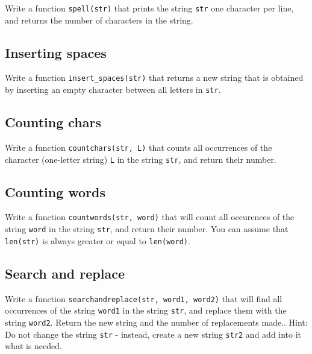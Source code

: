 Write a function {\tt spell(str)} that prints the string {\tt str} one character 
per line, and returns the number of characters in the string.


\subsection{Inserting spaces}

Write a function {\tt insert\_spaces(str)} that returns a new string that is obtained 
by inserting an empty character between all letters in {\tt str}. 


\subsection{Counting chars}

Write a function {\tt countchars(str, L)} that counts 
all occurrences of the character (one-letter string) {\tt L} in the string {\tt str}, 
and return their number. 


\subsection{Counting words}

Write a function {\tt countwords(str, word)} that will count 
all occurences of the string {\tt word} in the string {\tt str}, and 
return their number. You can assume that {\tt len(str)} is always greater 
or equal to {\tt len(word)}.


\subsection{Search and replace}

Write a function {\tt searchandreplace(str, word1, word2)} that will 
find all occurrences of the string {\tt word1} in the string {\tt str}, and 
replace them with the string {\tt word2}. Return the new string and the number
of replacements made..
Hint: Do not change the string {\tt str} - instead, 
create a new string {\tt str2} and add into it what is needed.

